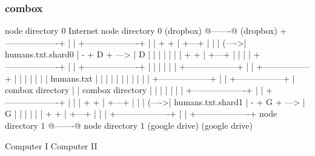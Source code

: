 \begin{frame}[fragile]
  \frametitle{combox}

  {\tiny
  \begin{semiverbatim}

         node directory 0                Internet              node directory 0
         (dropbox)                       @-------@             (dropbox)
        +-------------------+            |       |            +-------------------+
        |                   |    + +     | +---+ |            |                   |
  (---->| humans.txt.shard0 | - + D + ---> | D | |            |                   |
  |     |                   |    + +     | +---+ |            |                   |
  |     +-------------------+            |       |            +-------------------+
  |                                      |       |
  |                                      |       |
 +------------------+                    |       |                        +-----------------+
 |                  |                    |       |                        |                 |
 |  humans.txt      |                    |       |                        |                 |
 |                  |                    |       |                        |                 |
 +------------------+                    |       |                        +-----------------+
  |  combox directory                    |       |                      combox directory
  |                                      |       |
  |                                      |       |
  |     +-------------------+            |       |             +-------------------+
  |     |                   |    + +     | +---+ |             |                   |
  (---->| humans.txt.shard1 | - + G + ---> | G | |             |                   |
        |                   |    + +     | +---+ |             |                   |
        +-------------------+            |       |             +-------------------+
         node directory 1                @-------@              node directory 1
         (google drive)                                         (google drive)

  Computer I                                                                    Computer II
  \end{semiverbatim}
  }

\end{frame}


